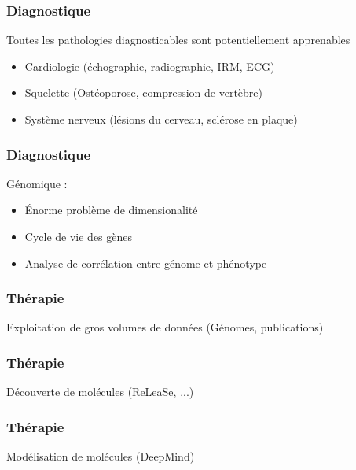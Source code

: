 \begin{frame}
  \frametitle{Diagnostique}
  Toutes les pathologies diagnosticables sont potentiellement apprenables
    \begin{itemize}
    \item Cardiologie (échographie, radiographie, IRM, ECG)
    \item Squelette (Ostéoporose, compression de vertèbre)
    \item Système nerveux (lésions du cerveau, sclérose en plaque)
    \end{itemize}
\end{frame}

\begin{frame}
  \frametitle{Diagnostique}
  Génomique :
  \newline
  \begin{minipage}[c]{0.49\linewidth}
    \begin{itemize}
    \item Énorme problème de dimensionalité
    \item Cycle de vie des gènes
    \item Analyse de corrélation entre génome et phénotype
    \end{itemize}
  \end{minipage}\hfill
  \begin{minipage}[c]{0.49\linewidth}
  \end{minipage}\hfill
\end{frame}

\begin{frame}
  \frametitle{Thérapie}
  Exploitation de gros volumes de données (Génomes, publications)
  \newline
  \newline
  \begin{minipage}[c]{0.49\linewidth}
  \end{minipage}\hfill
  \begin{minipage}[c]{0.49\linewidth}
  \end{minipage}\hfill
\end{frame}


\begin{frame}
  \frametitle{Thérapie}
  Découverte de molécules (ReLeaSe, ...) 
\end{frame}

\begin{frame}
  \frametitle{Thérapie}
  Modélisation de molécules (DeepMind)
\end{frame}

